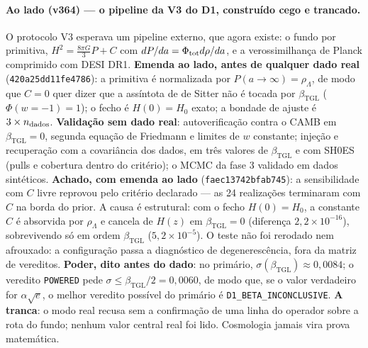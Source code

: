 \documentclass[11pt]{article}
\newcommand{\bTGL}{\beta_{\mathrm{TGL}}}\newcommand{\Msun}{M_{\odot}}\newcommand{\TGL}{\mathrm{TGL}}
\theoremstyle{definition}\newtheorem{deriv}{Derivação}
\begin{document}
\paragraph*{Ao lado (v364) --- o pipeline da V3 do D1, construído cego e trancado.} O protocolo V3 esperava um pipeline externo, que agora existe: o fundo por primitiva, $H^2=\tfrac{8\pi G}{3}P+C$ com $dP/da=\Phi_{\rm tot}d\rho/da$, e a verossimilhança de Planck comprimido com DESI DR1. \textbf{Emenda ao lado, antes de qualquer dado real} (\texttt{420a25dd11fe4786}): a primitiva é normalizada por $P(a\to\infty)=\rho_\Lambda$, de modo que $C=0$ quer dizer que a assíntota de de Sitter não é tocada por $\bTGL$ ($\Phi(w=-1)=1$); o fecho é $H(0)=H_0$ exato; a bondade de ajuste é $3\times n_{\rm dados}$. \textbf{Validação sem dado real}: autoverificação contra o CAMB em $\bTGL=0$, segunda equação de Friedmann e limites de $w$ constante; injeção e recuperação com a covariância dos dados, em três valores de $\bTGL$ e com SH0ES (pulls e cobertura dentro do critério); o MCMC da fase 3 validado em dados sintéticos. \textbf{Achado, com emenda ao lado} (\texttt{faec13742bfab745}): a sensibilidade com $C$ livre reprovou pelo critério declarado --- as 24 realizações terminaram com $C$ na borda do prior. A causa é estrutural: com o fecho $H(0)=H_0$, a constante $C$ é absorvida por $\rho_\Lambda$ e cancela de $H(z)$ em $\bTGL=0$ (diferença $2{,}2\times10^{-16}$), sobrevivendo só em ordem $\bTGL$ ($5{,}2\times10^{-5}$). O teste não foi rerodado nem afrouxado: a configuração passa a diagnóstico de degenerescência, fora da matriz de vereditos. \textbf{Poder, dito antes do dado}: no primário, $\sigma(\bTGL)\approx0{,}0084$; o veredito \texttt{POWERED} pede $\sigma\le\bTGL/2=0{,}0060$, de modo que, se o valor verdadeiro for $\alpha\sqrt e$, o melhor veredito possível do primário é \texttt{D1\_BETA\_INCONCLUSIVE}. \textbf{A tranca}: o modo real recusa sem a confirmação de uma linha do operador sobre a rota do fundo; nenhum valor central real foi lido. Cosmologia jamais vira prova matemática.
\end{document}
